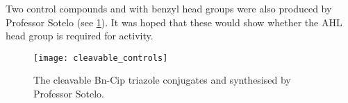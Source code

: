 Two control compounds  and  with benzyl head groups were also produced by Professor Sotelo (see \ref{fig:cleavable_controls}). It was hoped that these would show whether the AHL head group is required for activity.

\begin{figure}[H]
	\begin{center}
		\texttt{[image: cleavable\_controls]}
		\caption{
			The cleavable Bn-Cip triazole conjugates  and  synthesised by Professor Sotelo.
			\label{fig:cleavable_controls}}
	\end{center}
\end{figure}


